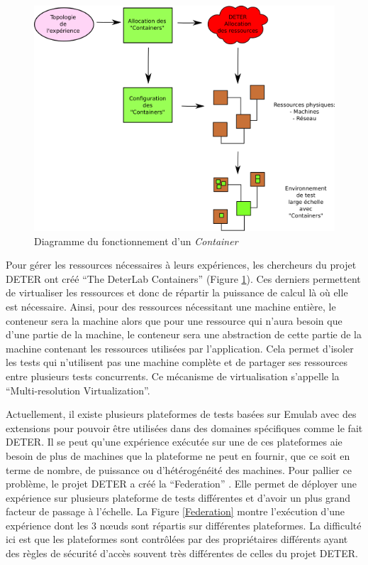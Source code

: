 \begin{figure}
  \centering \includegraphics[scale=0.75]{Pictures/png/Deter_fonctionnement_container_v2}
  \caption{Diagramme du fonctionnement d'un \textit{Container}}
  \label{Conteneur}
\end{figure}

Pour gérer les ressources nécessaires à leurs expériences, les
chercheurs du projet DETER ont créé ``The DeterLab Containers''
(Figure \ref{Conteneur}). Ces derniers permettent de virtualiser les
ressources et donc de répartir la puissance de calcul là où elle est
nécessaire. Ainsi, pour des ressources nécessitant une machine entière,
le conteneur sera la machine alors que pour une ressource qui n'aura
besoin que d'une partie de la machine, le conteneur sera une
abstraction de cette partie de la machine contenant les ressources
utilisées par l'application. Cela permet d'isoler les tests qui
n'utilisent pas une machine complète et de partager ses ressources
entre plusieurs tests concurrents. Ce mécanisme de virtualisation
s'appelle la ``Multi-resolution Virtualization''.

Actuellement, il existe plusieurs plateformes de tests basées sur Emulab avec
des extensions pour pouvoir être utilisées dans des domaines spécifiques comme
le fait DETER. Il se peut qu'une expérience exécutée sur une de ces plateformes
aie besoin de plus de machines que la plateforme ne peut en fournir, que ce soit
en terme de nombre, de puissance ou d'hétérogénéité des machines. Pour pallier
ce problème, le projet DETER a créé la
``Federation'' \citep{DETER_faber2007deter}. Elle permet de déployer une
expérience sur plusieurs plateforme de tests différentes et d'avoir un plus
grand facteur de passage à l'échelle. La Figure \ref{Federation} montre
l'exécution d'une expérience dont les 3 n\oe uds sont répartis sur différentes
plateformes. La difficulté ici est que les plateformes sont contrôlées par des
propriétaires différents ayant des règles de sécurité d'accès souvent très
différentes de celles du projet DETER.

